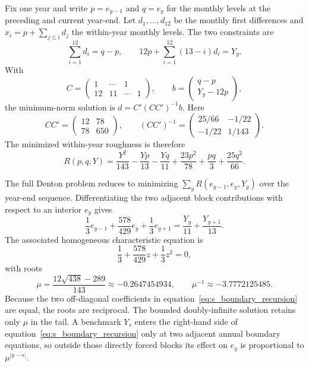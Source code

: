 \documentclass[12pt]{article}
\begin{document}
Fix one year and write $p=e_{y-1}$ and $q=e_y$ for the monthly levels at the preceding and current year-end. Let $d_1,\ldots,d_{12}$ be the monthly first differences and $x_i=p+\sum_{j\leq i}d_j$ the within-year monthly levels. The two constraints are
\[
\sum_{i=1}^{12}d_i=q-p,
\qquad
12p+\sum_{i=1}^{12}(13-i)d_i=Y_y.
\]
With
\[
C=\begin{pmatrix}
1&\cdots&1\\
12&11&\cdots&1
\end{pmatrix},
\qquad
b=\begin{pmatrix}q-p\\Y_y-12p\end{pmatrix},
\]
the minimum-norm solution is $d=C'(CC')^{-1}b$. Here
\[
CC'=\begin{pmatrix}12&78\\78&650\end{pmatrix},
\qquad
(CC')^{-1}=\begin{pmatrix}25/66&-1/22\\-1/22&1/143\end{pmatrix}.
\]
The minimized within-year roughness is therefore
\begin{equation}
R(p,q,Y)
=\frac{Y^2}{143}-\frac{Yp}{13}-\frac{Yq}{11}
 +\frac{23p^2}{78}+\frac{pq}{3}+\frac{25q^2}{66}.
\label{eq:s_R}
\end{equation}

The full Denton problem reduces to minimizing $\sum_y R(e_{y-1},e_y,Y_y)$ over the year-end sequence. Differentiating the two adjacent block contributions with respect to an interior $e_y$ gives
\begin{equation}
\frac{1}{3}e_{y-1}+\frac{578}{429}e_y+\frac{1}{3}e_{y+1}
=\frac{Y_y}{11}+\frac{Y_{y+1}}{13}.
\label{eq:s_boundary_recursion}
\end{equation}
The associated homogeneous characteristic equation is
\[
\frac{1}{3}+\frac{578}{429}z+\frac{1}{3}z^2=0,
\]
with roots
\[
\mu=\frac{12\sqrt{438}-289}{143}\approx-0.2647454934,
\qquad
\mu^{-1}\approx-3.7772125485.
\]
Because the two off-diagonal coefficients in equation~\eqref{eq:s_boundary_recursion} are equal, the roots are reciprocal. The bounded doubly-infinite solution retains only $\mu$ in the tail. A benchmark $Y_s$ enters the right-hand side of equation~\eqref{eq:s_boundary_recursion} only at two adjacent annual boundary equations, so outside those directly forced blocks its effect on $e_y$ is proportional to $\mu^{|y-s|}$.
\end{document}
